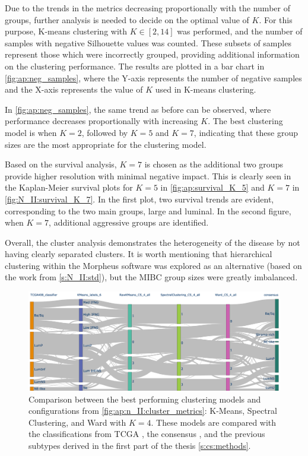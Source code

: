 Due to the trends in the metrics decreasing proportionally with the number of groups, further analysis is needed to decide on the optimal value of $K$. For this purpose, K-means clustering with $K \in [2,14]$ was performed, and the number of samples with negative Silhouette values was counted. These subsets of samples represent those which were incorrectly grouped, providing additional information on the clustering performance. The results are plotted in a bar chart in \cref{fig:ap:neg_samples}, where the Y-axis represents the number of negative samples and the X-axis represents the value of $K$ used in K-means clustering.

In \cref{fig:ap:neg_samples}, the same trend as before can be observed, where performance decreases proportionally with increasing $K$. The best clustering model is when $K=2$, followed by $K=5$ and $K=7$, indicating that these group sizes are the most appropriate for the clustering model. 


Based on the survival analysis, $K=7$ is chosen as the additional two groups provide higher resolution with minimal negative impact. This is clearly seen in the Kaplan-Meier survival plots for $K=5$ in \cref{fig:ap:survival_K_5} and $K=7$ in \cref{fig:N_II:survival_K_7}. In the first plot, two survival trends are evident, corresponding to the two main groups, large and luminal. In the second figure, when $K=7$, additional aggressive groups are identified.

Overall, the cluster analysis demonstrates the heterogeneity of the disease by not having clearly separated clusters. It is worth mentioning that hierarchical clustering within the Morpheus software \cite{Broad-Institute2016-tn} was explored as an alternative (based on the work from \cref{s:N_II:std}), but the MIBC group sizes were greatly imbalanced.

\begin{figure}[H]    
    \centering
    \includegraphics[width=1.0\textwidth,height=1.0\textheight,keepaspectratio]{Sections/Network_II/resources/reward/cluster_analysis/cluster_comp.png}
    \caption[MIBC subtypes comparisons across clustering models]{Comparison between the best performing clustering models and configurations from \cref{fig:ap:n_II:cluster_metrics}: K-Means, Spectral Clustering, and Ward with $K=4$. These models are compared with the classifications from TCGA \citep{Robertson2017-mg}, the consensus \citep{Kamoun2020-tj}, and the previous subtypes derived in the first part of the thesis \cref{s:cs:methods}.}
    \label{fig:ap:cs_sankey}
\end{figure}

